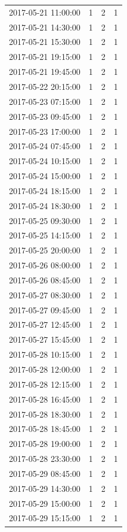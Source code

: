 \begin{tabular}{lrrr}
2017-05-21 11:00:00 & 1 & 2 & 1 \\
2017-05-21 14:30:00 & 1 & 2 & 1 \\
2017-05-21 15:30:00 & 1 & 2 & 1 \\
2017-05-21 19:15:00 & 1 & 2 & 1 \\
2017-05-21 19:45:00 & 1 & 2 & 1 \\
2017-05-22 20:15:00 & 1 & 2 & 1 \\
2017-05-23 07:15:00 & 1 & 2 & 1 \\
2017-05-23 09:45:00 & 1 & 2 & 1 \\
2017-05-23 17:00:00 & 1 & 2 & 1 \\
2017-05-24 07:45:00 & 1 & 2 & 1 \\
2017-05-24 10:15:00 & 1 & 2 & 1 \\
2017-05-24 15:00:00 & 1 & 2 & 1 \\
2017-05-24 18:15:00 & 1 & 2 & 1 \\
2017-05-24 18:30:00 & 1 & 2 & 1 \\
2017-05-25 09:30:00 & 1 & 2 & 1 \\
2017-05-25 14:15:00 & 1 & 2 & 1 \\
2017-05-25 20:00:00 & 1 & 2 & 1 \\
2017-05-26 08:00:00 & 1 & 2 & 1 \\
2017-05-26 08:45:00 & 1 & 2 & 1 \\
2017-05-27 08:30:00 & 1 & 2 & 1 \\
2017-05-27 09:45:00 & 1 & 2 & 1 \\
2017-05-27 12:45:00 & 1 & 2 & 1 \\
2017-05-27 15:45:00 & 1 & 2 & 1 \\
2017-05-28 10:15:00 & 1 & 2 & 1 \\
2017-05-28 12:00:00 & 1 & 2 & 1 \\
2017-05-28 12:15:00 & 1 & 2 & 1 \\
2017-05-28 16:45:00 & 1 & 2 & 1 \\
2017-05-28 18:30:00 & 1 & 2 & 1 \\
2017-05-28 18:45:00 & 1 & 2 & 1 \\
2017-05-28 19:00:00 & 1 & 2 & 1 \\
2017-05-28 23:30:00 & 1 & 2 & 1 \\
2017-05-29 08:45:00 & 1 & 2 & 1 \\
2017-05-29 14:30:00 & 1 & 2 & 1 \\
2017-05-29 15:00:00 & 1 & 2 & 1 \\
2017-05-29 15:15:00 & 1 & 2 & 1 \\

\end{tabular}
